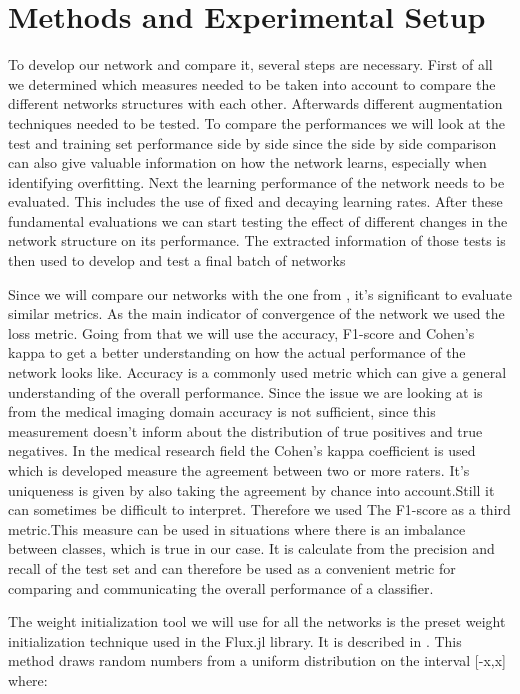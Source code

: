 \documentclass[
a4paper, 
12pt,
grayscalebody, %
abstract=on,
twoside, BCOR10mm, 12pt, DIV13,headinclude, footexclude, final, abstracton, openright
]{ibireprt}
\numberwithin{equation}{chapter}
\numberwithin{table}{chapter}
\numberwithin{figure}{chapter}
\numberwithin{algorithm}{chapter}
\numberwithin{example}{chapter}
\numberwithin{example}{chapter}
\begin{document}
\chapter{Methods and Experimental Setup }

To develop our network and compare it, several steps are necessary. First of all we determined which measures needed to be taken into account to compare the different networks structures with each other. Afterwards different augmentation techniques needed to be tested. To compare the performances we will look at the test and training set performance side by side since the side by side comparison can also give valuable information on how the network learns, especially when identifying overfitting. Next the learning performance of the network needs to be evaluated. This includes the use of fixed and decaying learning rates. After these fundamental evaluations we can start testing the effect of different changes in the network structure on its performance. The extracted information of those tests is then used to develop and test a final batch of networks

Since we will compare our networks with the one from \cite{Walle2023}, it's significant to evaluate similar metrics. As the main indicator of convergence of the network we used the loss metric. Going from that we will use the accuracy, F1-score and Cohen's kappa to get a better understanding on how the actual performance of the network looks like. Accuracy is a commonly used metric which can give a general understanding of the overall performance. Since the issue we are looking at is from the medical imaging domain accuracy is not sufficient, since this measurement doesn't inform about the distribution of true positives and true negatives. In the medical  research field the Cohen's kappa coefficient is used which is developed measure the agreement between two or more raters. It's uniqueness is given by also taking the agreement by chance into account.Still it can sometimes be difficult to interpret. 
Therefore we used The F1-score as a third metric.This measure can be used in situations where there is an imbalance between classes, which is true in our case. It is calculate from the precision and recall of the test set and can therefore be used as a convenient metric for comparing and communicating the overall performance of a classifier. 

The weight initialization tool we will use for all the networks is the preset weight initialization technique used in the Flux.jl library. It  is described in \cite{glorot2010}. This method draws random numbers from a uniform distribution on the interval [-x,x] where:
\end{document}
